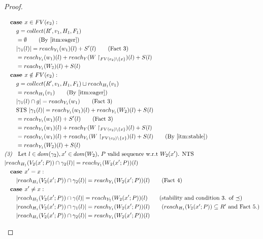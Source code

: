 \documentclass[11pt]{article}
\theoremstyle{definition}
\begin{document}
\begin{proof}
\begin{description}
\begin{align*}
		&\quad \textbf{case } x \in FV(e_2):\\
		&\quad\quad g =  collect(R',v_1,H_1,F_1) \\
		&\quad\quad = \emptyset  \tag{By \ref{itm:eager}}\\
		&\quad\quad |\gamma_1(l)| = reach_{Y_1}(w_1)(l) + S'(l) \tag{Fact 3}\\
		&\quad\quad = reach_{Y_1}(w_1)(l) + 
			reach_{Y}(W\restriction_{FV(e_2) \setminus \{x\}})(l) + S(l) \\
		&\quad\quad = reach_{Y_1}(W_2)(l) + S(l)  \\
		&\quad \textbf{case } x \notin FV(e_2):\\
		&\quad\quad g = collect(R',v_1,H_1,F_1) \sqcup reach_{H_1}(v_1)\\
		&\quad\quad = reach_{H_1}(v_1) \tag{By \ref{itm:eager}}\\
		&\quad\quad |\gamma_1(l) \cap g| = reach_{Y_1}(w_1) \tag{Fact 3}\\
		&\quad\quad \text{STS } |\gamma_1(l)| = reach_{Y_1}(w_1)(l) + reach_{Y_1}(W_2)(l) + S(l)\\
		&\quad\quad = reach_{Y_1}(w_1)(l) + S'(l)  \tag{Fact 3}\\
		&\quad\quad = reach_{Y_1}(w_1)(l) + reach_{Y}(W\restriction_{FV(e_2)\setminus \{x\}})(l) + S(l)\\
		&\quad\quad = reach_{Y_1}(w_1)(l) + reach_{Y_1}(W\restriction_{FV(e_2)\setminus \{x\}})(l) + S(l) 		\tag{By \ref{itm:stable}}\\
		&\quad\quad = reach_{Y_1}(W_2)(l) + S(l)\\
		&\emph{(3)}\quad \text{Let $l \in dom(\gamma_2), x' \in dom(W_2)$, 
			$P$ valid sequence w.r.t $W_2(x')$. NTS }\\ 
		&|reach_{H_1}(V_2(x';P)) \cap \gamma_2(l)| = reach_{Y_1}(W_2(x';P))(l)\\ 
		&\quad \textbf{case } x' = x:\\
		&\quad\quad |reach_{H_1}(V_2(x';P)) \cap \gamma_2(l)| = reach_{Y_1}(W_2(x';P))(l) \tag{Fact 4}\\ 
		&\quad \textbf{case } x' \ne x:\\
		&\quad\quad |reach_{H_1}(V_2(x';P)) \cap \gamma(l)| = reach_{Y_1}(W_2(x';P))(l) 
			\tag{stability and condition 3. of $\preceq$}\\ 
		&\quad\quad |reach_{H_1}(V_2(x';P)) \cap \gamma_1(l)| = reach_{Y_1}(W_2(x';P))(l) 
			\tag{$reach_{H_1}(V_2(x';P)) \subseteq R'$ and Fact 5.}\\
		&\quad\quad |reach_{H_1}(V_2(x';P)) \cap \gamma_2(l)| = reach_{Y_1}(W_2(x';P))(l) 

\end{align*}
\end{description}
\end{proof}
\end{document}
